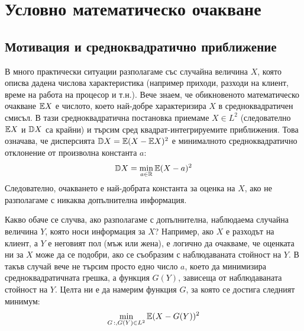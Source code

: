 \section{Условно математическо очакване}

\subsection{Мотивация и средноквадратично приближение}
В много практически ситуации разполагаме със случайна величина $X$, която описва дадена числова характеристика (например приходи, разходи на клиент, време на работа на процесор и т.н.). Вече знаем, че обикновеното математическо очакване $\mathbb{E} X$ е числото, което най-добре характеризира $X$ в средноквадратичен смисъл. В тази средноквадратична постановка приемаме $X\in L^2$ (следователно $\mathbb{E} X$ и $\mathbb{D} X$ са крайни) и търсим сред квадрат-интегрируемите приближения. Това означава, че дисперсията $\mathbb{D} X = \mathbb{E}(X - \mathbb{E} X)^2$ е минималното средноквадратично отклонение от произволна константа $a$:
\[
\mathbb{D} X = \min_{a \in \mathbb{R}} \mathbb{E}(X - a)^2
\]
Следователно, очакването е най-добрата константа за оценка на $X$, ако не разполагаме с никаква допълнителна информация.

Какво обаче се случва, ако разполагаме с допълнителна, наблюдаема случайна величина $Y$, която носи информация за $X$? Например, ако $X$ е разходът на клиент, а $Y$ е неговият пол (мъж или жена), е логично да очакваме, че оценката ни за $X$ може да се подобри, ако се съобразим с наблюдаваната стойност на $Y$. В такъв случай вече не търсим просто едно число $a$, което да минимизира средноквадратичната грешка, а функция $G(Y)$, зависеща от наблюдаваната стойност на $Y$. Целта ни е да намерим функция $G$, за която се достига следният минимум:
\[
\min_{G\,:,G(Y)\in L^2} \mathbb{E}(X - G(Y))^2
\]

